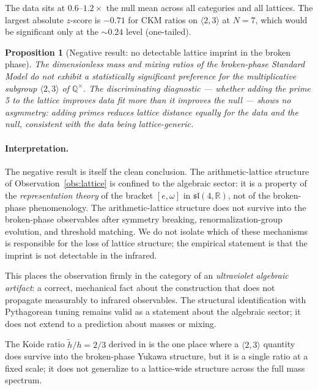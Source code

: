 \documentclass[11pt]{article}
\theoremstyle{plain}
\newtheorem{proposition}{Proposition}
\theoremstyle{remark}
\newcommand{\sln}[1]{\mathfrak{sl}(#1,\mathbb{R})}
\begin{document}
The data sits at $0.6$--$1.2 \times$ the null mean across all categories
and all lattices.  The largest absolute $z$-score is $-0.71$ for
CKM ratios on $\langle 2, 3 \rangle$ at $N = 7$, which would be
significant only at the $\sim\!\!0.24$ level (one-tailed).

\begin{proposition}[Negative result: no detectable lattice imprint
in the broken phase]
\label{prop:no-imprint}
The dimensionless mass and mixing ratios of the broken-phase
Standard Model do not exhibit a statistically significant preference
for the multiplicative subgroup $\langle 2, 3 \rangle$ of
$\mathbb{Q}^\times$.  The discriminating diagnostic --- whether
adding the prime 5 to the lattice improves data fit more than it
improves the null --- shows no asymmetry: adding primes reduces
lattice distance equally for the data and the null, consistent with
the data being lattice-generic.
\end{proposition}

\paragraph{Interpretation.}
The negative result is itself the clean conclusion.  The
arithmetic-lattice structure of Observation~\ref{obs:lattice} is
confined to the algebraic sector: it is a property of the
\emph{representation theory} of the bracket $[e, \omega]$ in $\sln{4}$,
not of the broken-phase phenomenology.  The arithmetic-lattice
structure does not survive into the broken-phase observables after
symmetry breaking, renormalization-group evolution, and threshold
matching.  We do not isolate which of these mechanisms is responsible
for the loss of lattice structure; the empirical statement is that
the imprint is not detectable in the infrared.

This places the observation firmly in the category of an
\emph{ultraviolet algebraic artifact}: a correct, mechanical fact
about the construction that does not propagate measurably to
infrared observables.  The structural identification with
Pythagorean tuning remains valid as a statement about the algebraic
sector; it does not extend to a prediction about masses or mixing.

The Koide ratio $\tilde h / h = 2/3$ derived in
\cite{WallaceA} is the one place where a $\langle 2, 3 \rangle$
quantity does survive into the broken-phase Yukawa structure, but
it is a single ratio at a fixed scale; it does not generalize
to a lattice-wide structure across the full mass spectrum.
\end{document}
